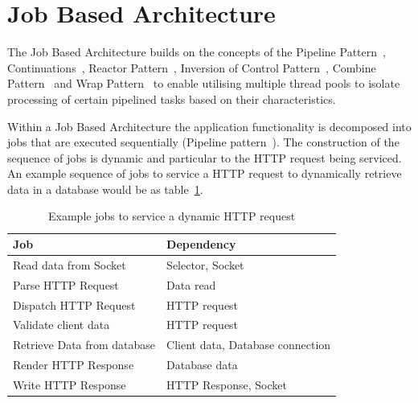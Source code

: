 \documentclass[conference]{ieee/IEEEtran}
\begin{document}
\section{Job Based Architecture}
The Job Based Architecture builds on the concepts of the Pipeline
Pattern~\cite{pipeline}, Continuations~\cite{continuations}, Reactor
Pattern~\cite{reactor}, Inversion of Control Pattern~\cite{ioc}, Combine
Pattern~\cite{pipeline} and Wrap Pattern~\cite{pipeline} to enable utilising
multiple thread pools to isolate processing of certain pipelined tasks based on
their characteristics.

Within a Job Based Architecture the application functionality is decomposed
into jobs that are executed sequentially (Pipeline pattern~\cite{pipeline}).  The
construction of the sequence of jobs is dynamic and particular to the HTTP
request being serviced.  An example sequence of jobs to service a HTTP request
to dynamically retrieve data in a database would be as table~\ref{tab:example_request_jobs}. 

\begin{table}[!t]
\renewcommand{\arraystretch}{1.3}
\caption{Example jobs to service a dynamic HTTP request}
\label{tab:example_request_jobs}
\centering
\begin{tabular}{l||l}
\hline
\bfseries Job & \bfseries Dependency \\
\hline
\hline
Read data from Socket & Selector, Socket \\
\hline
Parse HTTP Request & Data read \\
\hline
Dispatch HTTP Request & HTTP request \\
\hline
Validate client data & HTTP request \\
\hline
Retrieve Data from database & Client data, Database connection \\
\hline
Render HTTP Response & Database data \\
\hline
Write HTTP Response & HTTP Response, Socket \\
\hline
\end{tabular}
\end{table}
\end{document}
